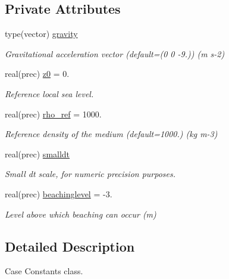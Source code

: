 \subsection*{Private Attributes}
\begin{DoxyCompactItemize}
\item 
type(vector) \mbox{\hyperlink{structsimulationglobals__mod_1_1constants__t_abe210fea4268af42f1cb950a1e3b3cfd}{gravity}}
\begin{DoxyCompactList}\small\item\em Gravitational acceleration vector (default=(0 0 -\/9.)) (m s-\/2) \end{DoxyCompactList}\item 
real(prec) \mbox{\hyperlink{structsimulationglobals__mod_1_1constants__t_a9dab4143c1d5fd54c8337d78ea9b7d82}{z0}} = 0.
\begin{DoxyCompactList}\small\item\em Reference local sea level. \end{DoxyCompactList}\item 
real(prec) \mbox{\hyperlink{structsimulationglobals__mod_1_1constants__t_ac466093200262cde2551525b04809d3a}{rho\+\_\+ref}} = 1000.
\begin{DoxyCompactList}\small\item\em Reference density of the medium (default=1000.) (kg m-\/3) \end{DoxyCompactList}\item 
real(prec) \mbox{\hyperlink{structsimulationglobals__mod_1_1constants__t_a4e417855b60f5eb0f45d3094495f532b}{smalldt}}
\begin{DoxyCompactList}\small\item\em Small dt scale, for numeric precision purposes. \end{DoxyCompactList}\item 
real(prec) \mbox{\hyperlink{structsimulationglobals__mod_1_1constants__t_a735a778cb615271495fe8d5dc2b964b7}{beachinglevel}} = -\/3.
\begin{DoxyCompactList}\small\item\em Level above which beaching can occur (m) \end{DoxyCompactList}\end{DoxyCompactItemize}


\subsection{Detailed Description}
Case Constants class. 

